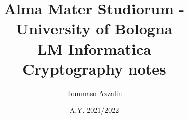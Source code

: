 \documentclass[10pt]{article}
\title{Alma Mater Studiorum - University of Bologna \\ LM Informatica \\ \textbf{Cryptography notes}}
\author{Tommaso Azzalin}
\date{A.Y. 2021/2022}
\begin{document}
\renewcommand{\contentsname}{Indice}

\maketitle
\clearpage

\tableofcontents
\clearpage
\end{document}
